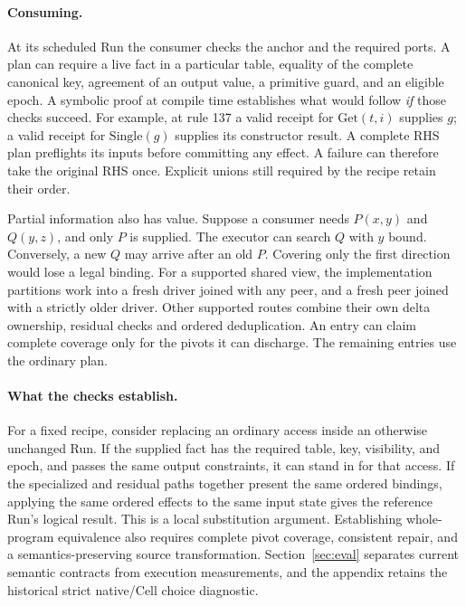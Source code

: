 \documentclass[10pt,letterpaper]{article}
\begin{document}
\paragraph{Consuming.}
At its scheduled Run the consumer checks the anchor and the required ports. A plan can require a live fact in a particular table, equality of the complete canonical key, agreement of an output value, a primitive guard, and an eligible epoch. A symbolic proof at compile time establishes what would follow \emph{if} those checks succeed. For example, at rule 137 a valid receipt for \(\mathrm{Get}(t,i)\) supplies \(g\); a valid receipt for \(\mathrm{Single}(g)\) supplies its constructor result. A complete RHS plan preflights its inputs before committing any effect. A failure can therefore take the original RHS once. Explicit unions still required by the recipe retain their order.

Partial information also has value. Suppose a consumer needs \(P(x,y)\) and \(Q(y,z)\), and only \(P\) is supplied. The executor can search \(Q\) with \(y\) bound. Conversely, a new \(Q\) may arrive after an old \(P\). Covering only the first direction would lose a legal binding. For a supported shared view, the implementation partitions work into a fresh driver joined with any peer, and a fresh peer joined with a strictly older driver. Other supported routes combine their own delta ownership, residual checks and ordered deduplication. An entry can claim complete coverage only for the pivots it can discharge. The remaining entries use the ordinary plan.

\paragraph{What the checks establish.}
For a fixed recipe, consider replacing an ordinary access inside an otherwise unchanged Run. If the supplied fact has the required table, key, visibility, and epoch, and passes the same output constraints, it can stand in for that access. If the specialized and residual paths together present the same ordered bindings, applying the same ordered effects to the same input state gives the reference Run's logical result. This is a local substitution argument. Establishing whole-program equivalence also requires complete pivot coverage, consistent repair, and a semantics-preserving source transformation. Section~\ref{sec:eval} separates current semantic contracts from execution measurements, and the appendix retains the historical strict native/Cell choice diagnostic.
\end{document}
